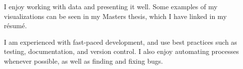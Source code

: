 I enjoy working with data and presenting it well.
Some examples of my visualizations can be seen in my Masters thesis, which I have linked in my r\'{e}sum\'{e}.

I am experienced with fast-paced development, and use best practices such as testing, documentation, and version control.
I also enjoy automating processes whenever possible, as well as finding and fixing bugs.
